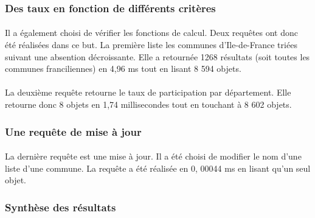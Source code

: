 
\subsubsection{Des taux en fonction de différents critères}
\paragraph{}Il a également choisi de vérifier les fonctions de calcul. Deux requêtes ont donc été réalisées dans ce but. La première liste les communes d'Ile-de-France triées suivant une absention décroissante. Elle a retournée 1268 résultats (soit toutes les communes franciliennes) en 4,96 ms tout en lisant 8 594 objets.

\paragraph{}La deuxième requête retourne le taux de participation par département. Elle retourne donc 8 objets en 1,74 millisecondes tout en touchant à 8 602 objets.

\subsubsection{Une requête de mise à jour}
\paragraph{}La dernière requête est une mise à jour. Il a été choisi de modifier le nom d'une liste d'une commune. La requête a été réalisée en 0, 00044 ms en lisant qu'un seul objet.

\subsubsection{Synthèse des résultats}
